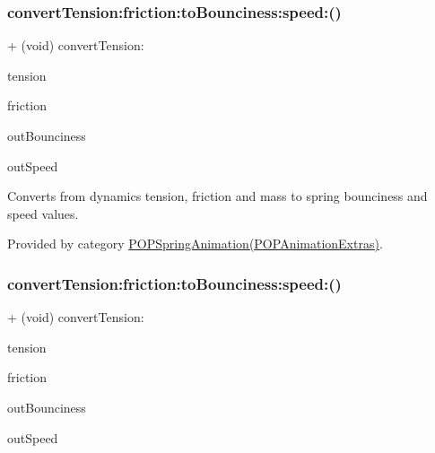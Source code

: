 \subsubsection{\texorpdfstring{convert\+Tension\+:friction\+:to\+Bounciness\+:speed\+:()}{convertTension:friction:toBounciness:speed:()}\hspace{0.1cm}{\footnotesize\ttfamily [2/3]}}
{\footnotesize\ttfamily + (void) convert\+Tension\+: \begin{DoxyParamCaption}\item[{(C\+G\+Float)}]{tension }\item[{friction:(C\+G\+Float)}]{friction }\item[{toBounciness:(C\+G\+Float $\ast$)}]{out\+Bounciness }\item[{speed:(C\+G\+Float $\ast$)}]{out\+Speed }\end{DoxyParamCaption}}

Converts from dynamics tension, friction and mass to spring bounciness and speed values. 

Provided by category \mbox{\hyperlink{category_p_o_p_spring_animation_07_p_o_p_animation_extras_08_a6b5d0ffdb16b10c6de3575d9d45b831b}{P\+O\+P\+Spring\+Animation(\+P\+O\+P\+Animation\+Extras)}}.

\mbox{\label{interface_p_o_p_spring_animation_a6b5d0ffdb16b10c6de3575d9d45b831b}} 
\subsubsection{\texorpdfstring{convert\+Tension\+:friction\+:to\+Bounciness\+:speed\+:()}{convertTension:friction:toBounciness:speed:()}\hspace{0.1cm}{\footnotesize\ttfamily [3/3]}}
{\footnotesize\ttfamily + (void) convert\+Tension\+: \begin{DoxyParamCaption}\item[{(C\+G\+Float)}]{tension }\item[{friction:(C\+G\+Float)}]{friction }\item[{toBounciness:(C\+G\+Float $\ast$)}]{out\+Bounciness }\item[{speed:(C\+G\+Float $\ast$)}]{out\+Speed }\end{DoxyParamCaption}}

